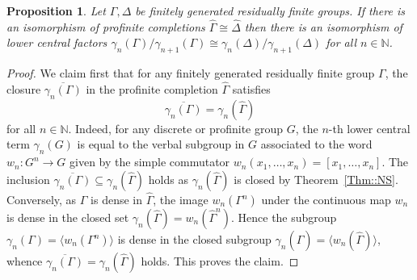 \documentclass{amsart}
\numberwithin{theorem}{section}
\numberwithin{equation}{section}
\newtheorem{proposition}[theorem]{Proposition}
\newcommand{\hD}{\widehat{\Delta}}
\newcommand{\hG}{\widehat{\Gamma}}
\begin{document}
\begin{proposition}\label{Prop::ProfiniteInvarianceOfCentralSeries}
    Let $\Gamma, \Delta$ be finitely generated residually finite groups. If there is an isomorphism of profinite completions $\hG \cong \hD$ then there is an isomorphism of lower central factors $\gamma_n(\Gamma)/\gamma_{n+1}(\Gamma) \cong \gamma_n(\Delta) / \gamma_{n+1}(\Delta)$ for all $n \in \mathbb{N}$. 
\end{proposition}
\begin{proof}
   We claim first that for any finitely generated residually finite group $\Gamma$, the closure $\overline{\gamma_n(\Gamma)}$ in the profinite completion $\hG$ satisfies \begin{equation}\label{Eq::gamma_closure}
       \overline{\gamma_n(\Gamma)} = \gamma_n(\hG)
   \end{equation} for all $n \in \mathbb{N}$. Indeed, for any discrete or profinite group $G$, the $n$-th lower central term $\gamma_n(G)$ is equal to the verbal subgroup in $G$ associated to the word $w_n \colon G^n \to G $ given by the simple commutator $w_n(x_1, \ldots, x_n) = [x_1, \ldots, x_n]$. The inclusion $\overline{\gamma_n(\Gamma)} \subseteq \gamma_n(\hG)$ holds as $\gamma_n(\hG)$ is closed by Theorem~\ref{Thm::NS}. Conversely, as $\Gamma$ is dense in $\hG$, the image $w_n(\Gamma^n)$ under the continuous map $w_n$ is dense in the closed set $\gamma_n(\hG) = w_n(\hG^n)$. Hence the subgroup $\gamma_n(\Gamma) = \langle w_n(\Gamma^n)\rangle$ is dense in the closed subgroup $\gamma_n(\hG) = \langle w_n(\hG) \rangle$, whence $\overline{\gamma_n(\Gamma)} = \gamma_n(\hG)$ holds. This proves the claim.


\end{proof}
\end{document}
